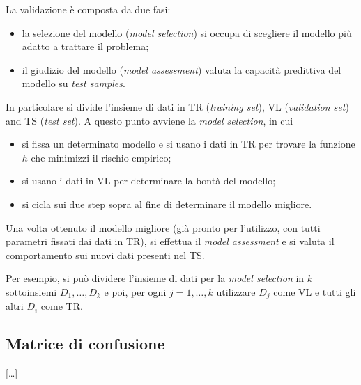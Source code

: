 La validazione è composta da due fasi:
\begin{itemize}
\item la selezione del modello (\emph{model selection}) si occupa di scegliere il modello più adatto a trattare il problema;
\item il giudizio del modello (\emph{model assessment}) valuta la capacità predittiva del modello su \emph{test samples}.
\end{itemize}
In particolare si divide l'insieme di dati in TR (\emph{training set}), VL (\emph{validation set}) and TS (\emph{test set}). A questo punto avviene la \emph{model selection}, in cui
\begin{itemize}
\item si fissa un determinato modello e si usano i dati in TR per trovare la funzione $h$ che minimizzi il rischio empirico;
\item si usano i dati in VL per determinare la bontà del modello;
\item si cicla sui due step sopra al fine di determinare il modello migliore.
\end{itemize}
Una volta ottenuto il modello migliore (già pronto per l'utilizzo, con tutti parametri fissati dai dati in TR), si effettua il \emph{model assessment} e si valuta il comportamento sui nuovi dati presenti nel TS.

\begin{example}
Per esempio, si può dividere l'insieme di dati per la \emph{model selection} in $k$ sottoinsiemi $D_1,\dots,D_k$ e poi, per ogni $j=1,\dots,k$ utilizzare $D_j$ come VL e tutti gli altri $D_i$ come TR.
\end{example}

\subsection{Matrice di confusione}

[\dots]
